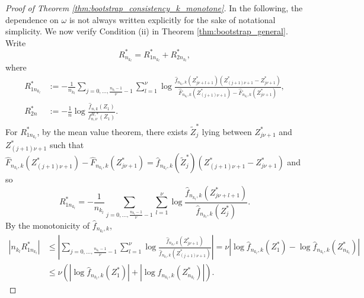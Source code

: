\documentclass[12pt,letterpaper, twoside, openany]{article}
\theoremstyle{plain}
\begin{document}
\begin{proof}[Proof of Theorem \ref{thm:bootstrap_consistency_k_monotone}]
In the following, the dependence on $\omega$ is not always written explicitly 	for the sake of notational simplicity. We now verify Condition (ii) in Theorem \ref{thm:bootstrap_general}. Write
\begin{equation*}
    R_{n_{k_l}}^* = R_{1{n_{k_l}}}^* +R_{2{n_{k_l}}}^*,
\end{equation*}
where
\begin{align*}
R_{1{n_{k_l}}}^* &:=	- \frac{1}{{n_{k_l}}} \sum_{j=0,\ldots,\frac{{n_{k_l}}-1}{\nu} - 1} 
	\sum^\nu_{l=1} \log \frac{\hat{f}_{{n_{k_l}},k}(Z_{j\nu+l+1}^*)(Z_{(j+1)\nu+1}^* - Z_{j\nu+1}^*)}{\hat{F}_{{n_{k_l}},k}(Z_{(j+1)\nu+1}^*) - \hat{F}_{{n_{k_l}},k}(Z_{j\nu+1}^*)},\\
	R_{2n}^* &:= -\frac{1}{n}\log \frac{\hat{f}_{n,k}(Z_1)}{f^{H,*}_{n,\nu}(Z_1)}.
\end{align*}
For $R_{1{n_{k_l}}}^*$, by the mean value theorem, there exists $\tilde{Z}^*_j$ lying between $Z_{j\nu+1}^*$ and $Z_{(j+1)\nu+1}^*$ such that $\hat{F}_{{n_{k_l}},k}(Z_{(j+1)\nu+1}^*) - \hat{F}_{{n_{k_l}},k}(Z_{j\nu+1}^*) = \hat{f}_{{n_{k_l}},k}(\tilde{Z}^*_j)(Z_{(j+1)\nu+1}^* - Z_{j\nu+1}^*)$ and so
	\begin{equation*}
R_{1{n_{k_l}}}^*  = -\frac{1}{{n_{k_l}}}\sum_{j=0,\ldots, \frac{{n_{k_l}}-1}{\nu}-1} \sum^\nu_{l=1} \log \frac{\hat{f}_{n_{k_l},k}(Z_{j\nu+l+1}^*)}{\hat{f}_{n_{k_l},k}(Z^*_j)}.
	\end{equation*}
 By the monotonicity of $\hat{f}_{n_{k_l},k}$,
\begin{align}
    |n_{k_l} R_{1n_{k_l}}^*| & \leq \left|  \sum_{j=0,\ldots, \frac{n_{k_l}-1}{\nu}-1} \sum^\nu_{l=1} \log \frac{\hat{f}_{n_{k_l},k}(Z_{j\nu+1}^*)}{\hat{f}_{n_{k_l},k}(Z_{(j+1)\nu+1}^*)}\right| 
    = \nu \left| \log \hat{f}_{n_{k_l},k}(Z_1^*) - \log \hat{f}_{n_{k_l},k}(Z_{n_{k_l}}^*)\right|\nonumber \\
    & \leq \nu (|\log \hat{f}_{n_{k_l},k}(Z_1^*)| + |\log \hat{f}_{n_{k_l},k}(Z_{n_{k_l}}^*)|). 
\end{align}
%

\end{proof}
\end{document}
